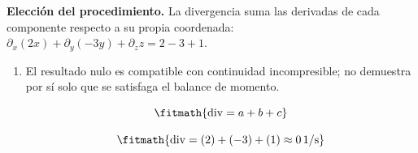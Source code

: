 \noindent\textbf{Elección del procedimiento.} La divergencia suma las derivadas de cada componente respecto a su propia coordenada: $\partial_x(2x)+\partial_y(-3y)+\partial_z z=2-3+1$.

\begin{enumerate}

\item El resultado nulo es compatible con continuidad incompresible; no demuestra por sí solo que se satisfaga el balance de momento.

\[\fitmath{\mathrm{div}=a+b+c}\]

\[\fitmath{\mathrm{div}=(2)+(-3)+(1)\approx 0\,\mathrm{1/s}}\]

\end{enumerate}
